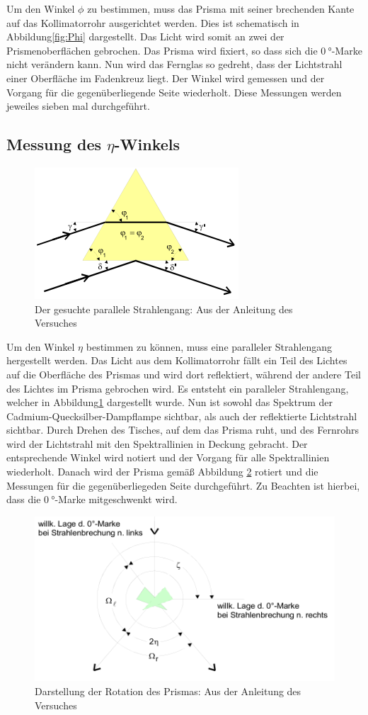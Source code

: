 Um den Winkel $\phi$ zu bestimmen, muss das Prisma mit seiner brechenden Kante auf das Kollimatorrohr ausgerichtet werden.
Dies ist schematisch in Abbildung\ref{fig:Phi} dargestellt.
Das Licht wird somit an zwei der Prismenoberflächen gebrochen.
Das Prisma wird fixiert, so dass sich die $\SI{0}{\degree}$-Marke nicht verändern kann.
Nun wird das Fernglas so gedreht, dass der Lichtstrahl einer Oberfläche im Fadenkreuz liegt.
Der Winkel wird gemessen und der Vorgang für die gegenüberliegende Seite wiederholt.
Diese Messungen werden jeweiles sieben mal durchgeführt.

\subsection{Messung des \texorpdfstring{$\eta$}{eta}-Winkels}

\begin{figure}
  \centering
  \includegraphics[scale=0.6]{images/Eta.png}
  \caption{Der gesuchte parallele Strahlengang: Aus der Anleitung des Versuches \cite[26]{1}}
  \label{fig:Eta}
\end{figure}

Um den Winkel $\eta$ bestimmen zu können, muss eine paralleler Strahlengang hergestellt werden.
Das Licht aus dem Kollimatorrohr fällt ein Teil des Lichtes auf die Oberfläche des Prismas und wird dort reflektiert, während der andere Teil des Lichtes im Prisma gebrochen wird.
Es entsteht ein paralleler Strahlengang, welcher in Abbildung\ref{fig:Eta} dargestellt wurde.
Nun ist sowohl das Spektrum der Cadmium-Quecksilber-Dampflampe sichtbar, als auch der reflektierte Lichtstrahl sichtbar.
Durch Drehen des Tisches, auf dem das Prisma ruht, und des Fernrohrs wird der Lichtstrahl mit den Spektrallinien in Deckung gebracht.
Der entsprechende Winkel wird notiert und der Vorgang für alle Spektrallinien wiederholt.
Danach wird der Prisma gemäß Abbildung \ref{fig:Drehung} rotiert und die Messungen für die gegenüberliegeden Seite durchgeführt.
Zu Beachten ist hierbei, dass die $\SI{0}{\degree}$-Marke mitgeschwenkt wird.

\begin{figure}
  \centering
  \includegraphics[scale=0.6]{images/Drehung.png}
  \caption{Darstellung der Rotation des Prismas: Aus der Anleitung des Versuches \cite[26]{1}}
  \label{fig:Drehung}
\end{figure}
